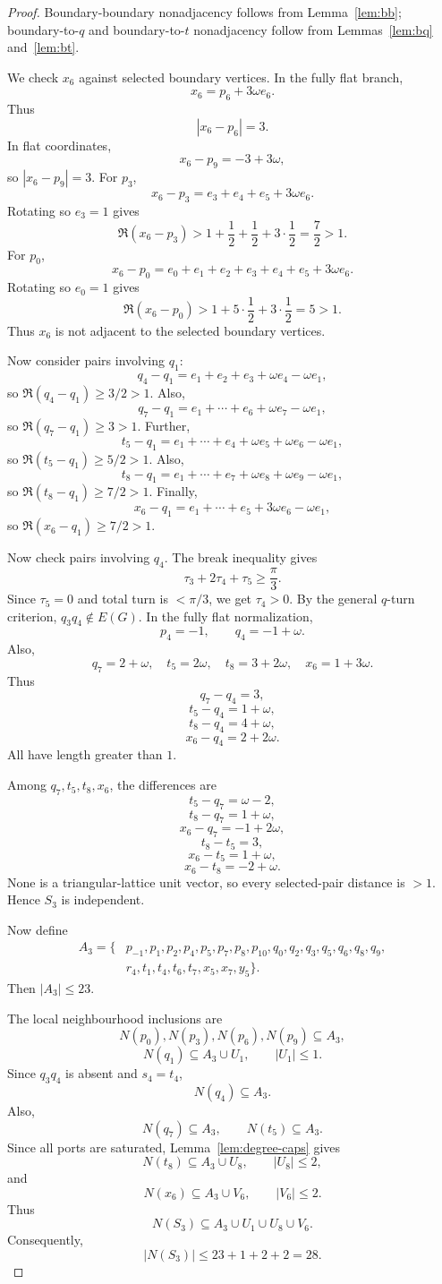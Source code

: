 \documentclass[11pt]{article}
\begin{document}
\begin{proof}
Boundary-boundary nonadjacency follows from Lemma~\ref{lem:bb}; boundary-to-$q$ and boundary-to-$t$ nonadjacency follow from Lemmas~\ref{lem:bq} and~\ref{lem:bt}.

We check $x_6$ against selected boundary vertices. In the fully flat branch,
\[
 x_6=p_6+3\omega e_6.
\]
Thus
\[
 |x_6-p_6|=3.
\]
In flat coordinates,
\[
 x_6-p_9=-3+3\omega,
\]
so $|x_6-p_9|=3$. For $p_3$,
\[
 x_6-p_3=e_3+e_4+e_5+3\omega e_6.
\]
Rotating so $e_3=1$ gives
\[
 \Re(x_6-p_3)>1+\frac12+\frac12+3\cdot\frac12=\frac72>1.
\]
For $p_0$,
\[
 x_6-p_0=e_0+e_1+e_2+e_3+e_4+e_5+3\omega e_6.
\]
Rotating so $e_0=1$ gives
\[
 \Re(x_6-p_0)>1+5\cdot\frac12+3\cdot\frac12=5>1.
\]
Thus $x_6$ is not adjacent to the selected boundary vertices.

Now consider pairs involving $q_1$:
\[
 q_4-q_1=e_1+e_2+e_3+\omega e_4-\omega e_1,
\]
so $\Re(q_4-q_1)\ge3/2>1$.
Also,
\[
 q_7-q_1=e_1+\cdots+e_6+\omega e_7-\omega e_1,
\]
so $\Re(q_7-q_1)\ge3>1$.
Further,
\[
 t_5-q_1=e_1+\cdots+e_4+\omega e_5+\omega e_6-\omega e_1,
\]
so $\Re(t_5-q_1)\ge5/2>1$.
Also,
\[
 t_8-q_1=e_1+\cdots+e_7+\omega e_8+\omega e_9-\omega e_1,
\]
so $\Re(t_8-q_1)\ge7/2>1$.
Finally,
\[
 x_6-q_1=e_1+\cdots+e_5+3\omega e_6-\omega e_1,
\]
so $\Re(x_6-q_1)\ge7/2>1$.

Now check pairs involving $q_4$. The break inequality gives
\[
 \tau_3+2\tau_4+\tau_5\ge\frac{\pi}{3}.
\]
Since $\tau_5=0$ and total turn is $<\pi/3$, we get $\tau_4>0$. By the general $q$-turn criterion, $q_3q_4\notin E(G)$.
In the fully flat normalization,
\[
 p_4=-1,
 \qquad q_4=-1+\omega.
\]
Also,
\[
 q_7=2+\omega,
 \quad t_5=2\omega,
 \quad t_8=3+2\omega,
 \quad x_6=1+3\omega.
\]
Thus
\[
 q_7-q_4=3,
\]
\[
 t_5-q_4=1+\omega,
\]
\[
 t_8-q_4=4+\omega,
\]
\[
 x_6-q_4=2+2\omega.
\]
All have length greater than $1$.

Among $q_7,t_5,t_8,x_6$, the differences are
\[
 t_5-q_7=\omega-2,
\]
\[
 t_8-q_7=1+\omega,
\]
\[
 x_6-q_7=-1+2\omega,
\]
\[
 t_8-t_5=3,
\]
\[
 x_6-t_5=1+\omega,
\]
\[
 x_6-t_8=-2+\omega.
\]
None is a triangular-lattice unit vector, so every selected-pair distance is $>1$. Hence $S_3$ is independent.

Now define
\[
\begin{aligned}
A_3=\{&p_{-1},p_1,p_2,p_4,p_5,p_7,p_8,p_{10},q_0,q_2,q_3,q_5,q_6,q_8,q_9,\\
&r_4,t_1,t_4,t_6,t_7,x_5,x_7,y_5\}.
\end{aligned}
\]
Then $|A_3|\le23$.

The local neighbourhood inclusions are
\[
 N(p_0),N(p_3),N(p_6),N(p_9)\subseteq A_3,
\]
\[
 N(q_1)\subseteq A_3\cup U_1,
 \qquad |U_1|\le1.
\]
Since $q_3q_4$ is absent and $s_4=t_4$,
\[
 N(q_4)\subseteq A_3.
\]
Also,
\[
 N(q_7)\subseteq A_3,
 \qquad N(t_5)\subseteq A_3.
\]
Since all ports are saturated, Lemma~\ref{lem:degree-caps} gives
\[
 N(t_8)\subseteq A_3\cup U_8,
 \qquad |U_8|\le2,
\]
and
\[
 N(x_6)\subseteq A_3\cup V_6,
 \qquad |V_6|\le2.
\]
Thus
\[
 N(S_3)\subseteq A_3\cup U_1\cup U_8\cup V_6.
\]
Consequently,
\[
 |N(S_3)|\le23+1+2+2=28.
\]
\end{proof}
\end{document}
